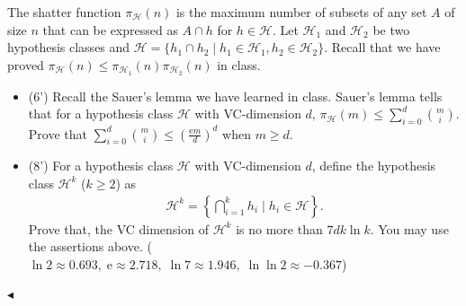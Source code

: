 ﻿\documentclass[11pt]{article}
\newenvironment{problem}[2][Problem]{\begin{trivlist}
\item[\hskip \labelsep {\bfseries #1}\hskip \labelsep {\bfseries #2.}]}{\hfill$\blacktriangleleft$\end{trivlist}}
\begin{document}
\begin{problem}{2 (14')} The shatter function $\pi_\mathcal{H}(n)$ is the maximum number of subsets of any set $A$ of size $n$ that can be expressed as $A\cap h$ for $h\in \mathcal{H}$. Let $\mathcal{H}_1$ and $\mathcal{H}_2$ be two hypothesis classes and $\mathcal{H}=\{h_1\cap h_2\mid h_1\in \mathcal{H}_1,h_2\in \mathcal{H}_2\}$. Recall that we have proved $\pi_\mathcal{H}(n)\leq\pi_{\mathcal{H}_1}(n)\pi_{\mathcal{H}_2}(n)$ in class. 

\begin{itemize}
    \item [(1)] (6') Recall the Sauer's lemma we have learned in class. Sauer's lemma tells that for a hypothesis class $\mathcal{H}$ with VC-dimension $d$, $\pi_\mathcal{H}(m)\leq\sum_{i=0}^d\binom{m}{i}$. Prove that $\sum_{i=0}^d\binom{m}{i}\leq\left(\frac{\mathrm{e}m}{d}\right)^d$ when $m\geq d$.
    \item [(2)] (8') For a hypothesis class $\mathcal{H}$ with VC-dimension $d$, define the hypothesis class $\mathcal{H}^k$ ($k\geq 2$) as
    \begin{align*}
        \mathcal{H}^k=\left\{\bigcap_{i=1}^k h_i\;\big|\; h_i\in \mathcal{H}\right\}.
    \end{align*}
    Prove that, the VC dimension of $\mathcal{H}^k$ is no more than $7dk\ln k$. You may use the assertions above. ($\ln 2\approx0.693,\;\mathrm{e}\approx2.718,\;\ln 7\approx 1.946,\;\ln\ln 2\approx-0.367$)
\end{itemize}
\end{problem}
\end{document}
